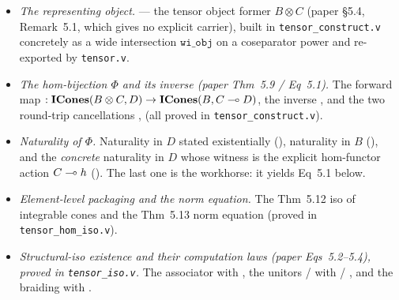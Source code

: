 \begin{itemize}
  \item \emph{The representing object.}\label{def:tensor-object}
    \rocqok{} ---
    the tensor object former $B \otimes C$ (paper \S5.4, Remark~5.1,
    which gives no explicit carrier), built in \texttt{tensor\_construct.v}
    concretely as a wide intersection $\texttt{wi\_obj}$ on a coseparator
    power and re-exported by \texttt{tensor.v}.
  \item \emph{The hom-bijection $\Phi$ and its inverse (paper Thm~5.9 /
    Eq~5.1).} The forward map
    \rocqok{}
    $:\mathbf{ICones}(B \otimes C, D) \to \mathbf{ICones}(B, C \multimap D)$, the inverse
    \rocqok{},
    and the two round-trip cancellations
    \rocqok{},
    \rocqok{}
    (all proved in \texttt{tensor\_construct.v}).
  \item \emph{Naturality of $\Phi$.} Naturality in $D$ stated
    existentially
    (\rocqok{}),
    naturality in $B$
    (\rocqok{}),
    and the \emph{concrete} naturality in $D$ whose witness
    is the explicit hom-functor action $C \multimap h$
    (\rocqok{}).
    The last one is the workhorse: it yields Eq~5.1 below.
  \item \emph{Element-level packaging and the norm equation.} The
    Thm~5.12 iso of integrable cones
    \rocqok{}
    and the Thm~5.13 norm equation
    \rocqok{}
    (proved in \texttt{tensor\_hom\_iso.v}).
  \item \emph{Structural-iso existence and their computation laws (paper
    Eqs~5.2--5.4), proved in \texttt{tensor\_iso.v}.} The associator
    \rocqok{}
    with
    \rocqok{}, the
    unitors
    \rocqok{}
    /
    \rocqok{}
    with
    \rocqok{} /
    \rocqok{}, and
    the braiding
    \rocqok{}
    with
    \rocqok{}.
\end{itemize}

